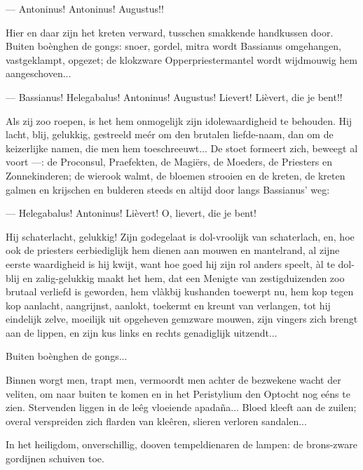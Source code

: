 \documentclass[a4paper, 12pt, oneside, dutch]{article}
\begin{document}
--- Antoninus! Antoninus! Augustus!!

Hier en daar zijn het kreten verward, tusschen smakkende handkussen door. Buiten boènghen de gongs: snoer, gordel, mitra wordt Bassianus omgehangen, vastgeklampt, opgezet; de klokzware Opperpriestermantel wordt wijdmouwig hem aangeschoven...

--- Bassianus! Helegabalus! Antoninus! Augustus! Lievert! Lièvert, die je bent!!

Als zij zoo roepen, is het hem onmogelijk zijn idolewaardigheid te behouden. Hij lacht, blij, gelukkig, gestreeld meér om den brutalen liefde-naam, dan om de keizerlijke namen, die men hem toeschreeuwt... De stoet formeert zich, beweegt al voort ---: de Proconsul, Praefekten, de Magiërs, de Moeders, de Priesters en Zonnekinderen; de wierook walmt, de bloemen strooien en de kreten, de kreten galmen en krijschen en bulderen steeds en altijd door langs Bassianus' weg:

--- Helegabalus! Antoninus! Lièvert! O, lievert, die je bent!

Hij schaterlacht, gelukkig! Zijn godegelaat is dol-vroolijk van schaterlach, en, hoe ook de priesters eerbiediglijk hem dienen aan mouwen en mantelrand, al zijne eerste waardigheid is hij kwijt, want hoe goed hij zijn rol anders speelt, àl te dol-blij en zalig-gelukkig maakt het hem, dat een Menigte van zestigduizenden zoo brutaal verliefd is geworden, hem vlàkbij kushanden toewerpt nu, hem kop tegen kop aanlacht, aangrijnst, aanlokt, toekermt en kreunt van verlangen, tot hij eindelijk zelve, moeilijk uit opgeheven gemzware mouwen, zijn vingers zich brengt aan de lippen, en zijn kus links en rechts genadiglijk uitzendt...

Buiten boènghen de gongs...

Binnen worgt men, trapt men, vermoordt men achter de bezwekene wacht der veliten, om naar buiten te komen en in het Peristylium den Optocht nog eéns te zien. Stervenden liggen in de leêg vloeiende apadaña... Bloed kleeft aan de zuilen; overal verspreiden zich flarden van kleêren, slieren verloren sandalen...

In het heiligdom, onverschillig, dooven tempeldienaren de lampen: de brons-zware gordijnen schuiven toe.

\subsection{}
\end{document}
